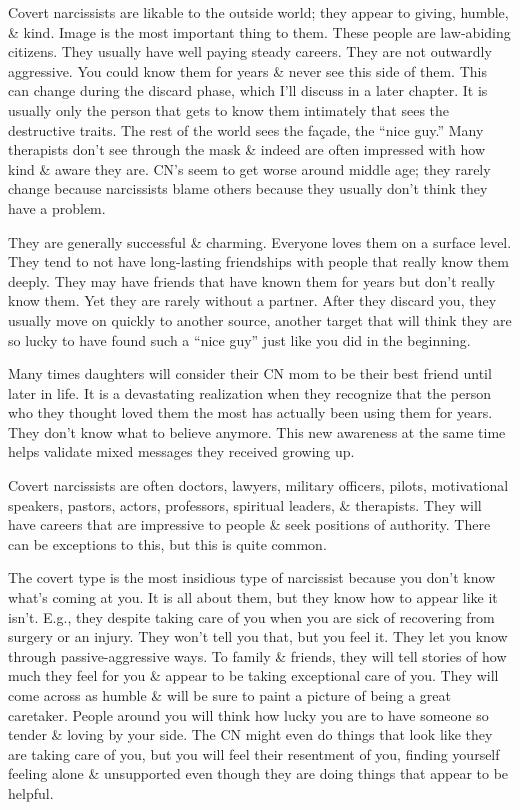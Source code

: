 \documentclass{article}
\numberwithin{equation}{section}
\begin{document}
Covert narcissists are likable to the outside world; they appear to giving, humble, \& kind. Image is the most important thing to them. These people are law-abiding citizens. They usually have well paying steady careers. They are not outwardly aggressive. You could know them for years \& never see this side of them. This can change during the discard phase, which I'll discuss in a later chapter. It is usually only the person that gets to know them intimately that sees the destructive traits. The rest of the world sees the fa\c{c}ade, the ``nice guy.'' Many therapists don't see through the mask \& indeed are often impressed with how kind \& aware they are. CN's seem to get worse around middle age; they rarely change because narcissists blame others because they usually don't think they have a problem.

They are generally successful \& charming. Everyone loves them on a surface level. They tend to not have long-lasting friendships with people that really know them deeply. They may have friends that have known them for years but don't really know them. Yet they are rarely without a partner. After they discard you, they usually move on quickly to another source, another target that will think they are so lucky to have found such a ``nice guy'' just like you did in the beginning.

Many times daughters will consider their CN mom to be their best friend until later in life. It is a devastating realization when they recognize that the person who they thought loved them the most has actually been using them for years. They don't know what to believe anymore. This new awareness at the same time helps validate mixed messages they received growing up.

Covert  narcissists are often doctors, lawyers, military officers, pilots, motivational speakers, pastors, actors, professors, spiritual leaders, \& therapists. They will have careers that are impressive to people \& seek positions of authority. There can be exceptions to this, but this is quite common.

The covert type is the most insidious type of narcissist because you don't know what's coming at you. It is all about them, but they know how to appear like it isn't. E.g., they despite taking care of you when you are sick of recovering from surgery or an injury. They won't tell you that, but you feel it. They let you know through passive-aggressive ways. To family \& friends, they will tell stories of how much they feel for you \& appear to be taking exceptional care of you. They will come across as humble \& will be sure to paint a picture of being a great caretaker. People around you will think how lucky you are to have someone so tender \& loving by your side. The CN might even do things that look like they are taking care of you, but you will feel their resentment of you, finding yourself feeling alone \& unsupported even though they are doing things that appear to be helpful.
\end{document}
